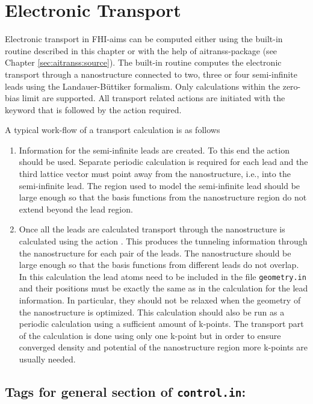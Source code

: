 \section{Electronic Transport}
\label{section electronic transport}

Electronic transport in FHI-aims can be computed either using the
built-in routine described in this chapter or with the help of
aitranss-package (see Chapter \ref{sec:aitranss:source}). The built-in
routine computes the electronic transport through a nanostructure
connected to two, three or four semi-infinite leads using the
Landauer-B\"uttiker formalism. Only calculations within the zero-bias
limit are supported. All transport related actions are initiated with
the keyword  that is followed by the action
required.

A typical work-flow of a transport calculation is as follows
\begin{enumerate}
\item Information for the semi-infinite leads are created. To this end
  the action  should be used. Separate
  periodic calculation is required for each lead and the third lattice
  vector must point away from the nanostructure, i.e., into the
  semi-infinite lead. The region used to model the semi-infinite lead
  should be large enough so that the basis functions from the
  nanostructure region do not extend beyond the lead region.
\item Once all the leads are calculated transport through the
  nanostructure is calculated using the action
  .  This produces the tunneling
  information through the nanostructure for each pair of the
  leads. The nanostructure should be large enough so that the basis
  functions from different leads do not overlap. In this calculation
  the lead atoms need to be included in the file \texttt{geometry.in}
  and their positions must be exactly the same as in the calculation
  for the lead information. In particular, they should not be relaxed
  when the geometry of the nanostructure is optimized. This
  calculation should also be run as a periodic calculation using a
  sufficient amount of k-points. The transport part of the calculation
  is done using only one k-point but in order to ensure converged
  density and potential of the nanostructure region more k-points are
  usually needed.
\end{enumerate}

\subsection*{Tags for general section of \texttt{control.in}:}

